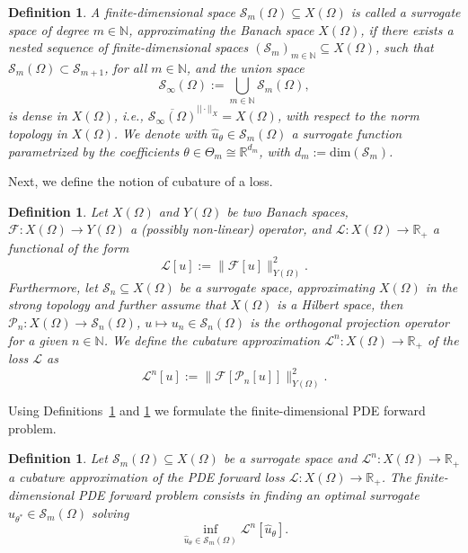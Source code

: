 \documentclass[pdflatex]{sn-jnl}%
\newtheorem{definition}[theorem]{Definition}
\begin{document}
\begin{definition}\label{def:surr_sp}
    A finite-dimensional space $\mathcal{S}_m(\Omega)\subseteq X(\Omega)$ is called a \emph{surrogate space} of degree $m\in \mathbb{N}$, approximating the Banach space $X(\Omega)$, if there exists a nested sequence of finite-dimensional spaces $(\mathcal{S}_m)_{m\in \mathbb{N}}\subseteq X(\Omega)$, such that $\mathcal{S}_{m}(\Omega)\subset \mathcal{S}_{m+1}$, for all $m\in \mathbb{N}$, and the union space
    \begin{equation}
        \mathcal{S}_{\infty}(\Omega):= \bigcup\limits_{m\in \mathbb{N}}\mathcal{S}_{m}(\Omega),
    \end{equation}
    is dense in $X(\Omega)$, i.e., $\overline{ \mathcal{S}_\infty(\Omega)}^{||\cdot||_X}= X(\Omega)$, with respect to the norm topology in $X(\Omega)$. We denote with $\hat{u}_\theta\in \mathcal{S}_m(\Omega)$ a surrogate function parametrized by the coefficients $\theta\in \Theta_m\cong\mathbb{R}^{d_m}$, with $d_m:=\mathrm{dim}(\mathcal{S}_m)$.
\end{definition}
Next, we define the notion of cubature of a loss. 
\begin{definition}\label{def:cub}
    Let $X(\Omega)$ and $Y(\Omega)$ be two Banach spaces, $\mathcal{F}:X(\Omega)\rightarrow Y(\Omega)$ a (possibly non-linear) operator, and $\mathcal{L}:X(\Omega)\rightarrow \mathbb{R}_+$ a functional of the form
    $$\mathcal{L}[u]:=\|\mathcal{F}[u]\|_{Y(\Omega)}^2.$$ 
    Furthermore, let $\mathcal{S}_n\subseteq X(\Omega)$ be a surrogate space, approximating $X(\Omega)$ in the strong topology and further assume that $X(\Omega)$ is a Hilbert space, then $\mathcal{P}_n:X(\Omega)\rightarrow \mathcal{S}_n(\Omega)$, $u\mapsto u_n\in \mathcal{S}_n(\Omega)$ is the orthogonal projection operator for a given $n\in \mathbb{N}$. We define the \emph{cubature approximation}  $\mathcal{L}^n:X(\Omega)\rightarrow \mathbb{R}_+$ of the loss $\mathcal{L}$ as
    \begin{equation}\label{eq:cub_loss}
        \mathcal{L}^n[u]:=\|\mathcal{F}[\mathcal{P}_n[u]]\|_{Y(\Omega)}^2.
    \end{equation}
\end{definition}
Using Definitions~\ref{def:surr_sp} and \ref{def:cub} we formulate the finite-dimensional PDE forward problem.
\begin{definition}
    Let $\mathcal{S}_m(\Omega)\subseteq X(\Omega)$ be a surrogate space and $\mathcal{L}^n:X(\Omega)\rightarrow\mathbb{R}_+$ a cubature approximation of the PDE forward loss $\mathcal{L}:X(\Omega)\rightarrow\mathbb{R}_+$. The \emph{finite-dimensional PDE forward problem} consists in finding an optimal surrogate $\hat{u}_{\theta^*}\in \mathcal{S}_m(\Omega)$ solving
    \begin{equation}
        \inf\limits_{\hat{u}_\theta\in \mathcal{S}_m(\Omega)} \mathcal{L}^n[\hat{u}_\theta].
    \end{equation}
\end{definition}
\end{document}
